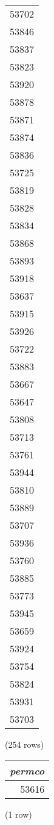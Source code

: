 \begin{tabular}{r}
53702 \\
53846 \\
53837 \\
53823 \\
53920 \\
53878 \\
53871 \\
53874 \\
53836 \\
53725 \\
53819 \\
53828 \\
53834 \\
53868 \\
53893 \\
53918 \\
53637 \\
53915 \\
53926 \\
53722 \\
53883 \\
53667 \\
53647 \\
53808 \\
53713 \\
53761 \\
53944 \\
53810 \\
53889 \\
53707 \\
53936 \\
53760 \\
53885 \\
53773 \\
53945 \\
53659 \\
53924 \\
53754 \\
53824 \\
53931 \\
53703 \\
\end{tabular}

\noindent (254 rows) \\

\begin{tabular}{r}
\textit{permco} \\
\hline
53616 \\
\end{tabular}

\noindent (1 row) \\

